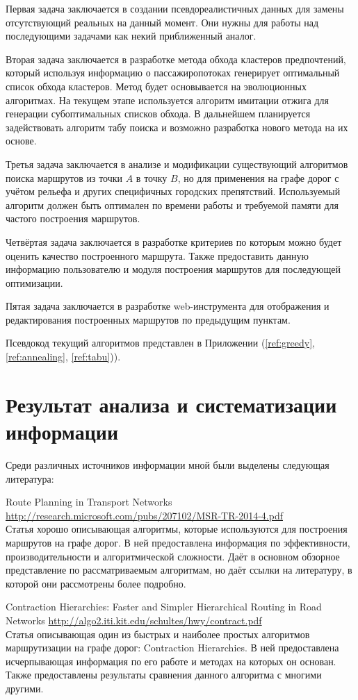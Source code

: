 Первая задача заключается в создании псевдореалистичных данных для замены отсутствующий реальных 
на данный момент. Они нужны для работы над последующими задачами как некий приближенный аналог.

Вторая задача заключается в разработке метода обхода кластеров предпочтений, который используя 
информацию о пассажиропотоках генерирует оптимальный список обхода кластеров. Метод будет 
основывается на эволюционных алгоритмах. На текущем этапе используется алгоритм имитации отжига 
для генерации субоптимальных списков обхода. В дальнейшем планируется задействовать алгоритм 
табу поиска и возможно разработка нового метода на их основе.

Третья задача заключается в анализе и модификации существующий алгоритмов поиска маршрутов из 
точки \( A \) в точку \( B \), но для применения на графе дорог с учётом рельефа и других 
специфичных городских препятствий. Используемый алгоритм должен быть оптимален по времени работы 
и требуемой памяти для частого построения маршрутов.

Четвёртая задача заключается в разработке критериев по которым можно будет оценить качество 
построенного маршрута. Также предоставить данную информацию пользователю и модуля построения 
маршрутов для последующей оптимизации.

Пятая задача заключается в разработке web-инструмента для отображения и редактирования построенных 
маршрутов по предыдущим пунктам.


Псевдокод текущий алгоритмов представлен в Приложении (\ref{ref:greedy}, 
\ref{ref:annealing}, \ref{ref:tabu})).

\chapter{Результат анализа и систематизации информации}
Среди различных источников информации мной были выделены следующая литература:

Route Planning in Transport Networks 
\url{http://research.microsoft.com/pubs/207102/MSR-TR-2014-4.pdf}\\
Статья хорошо описывающая алгоритмы, которые используются для построения маршрутов на графе дорог. 
В ней предоставлена информация по эффективности, производительности и алгоритмической сложности.
Даёт в основном обзорное представление по рассматриваемым алгоритмам, но даёт ссылки на литературу, 
в которой они рассмотрены более подробно.

Contraction Hierarchies: Faster and Simpler Hierarchical Routing in Road Networks 
\url{http://algo2.iti.kit.edu/schultes/hwy/contract.pdf}\\
Статья описывающая один из быстрых и наиболее простых алгоритмов маршрутизации на графе дорог: 
Contraction Hierarchies. В ней предоставлена исчерпывающая информация по его работе и методах на 
которых он основан. Также предоставлены результаты сравнения данного алгоритма с многими другими.

